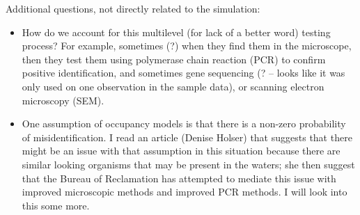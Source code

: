 \documentclass[12pt]{article}\usepackage[]{graphicx}\usepackage[]{color}
\begin{document}
Additional questions, not directly related to the simulation:
\begin{itemize}
	\item How do we account for this multilevel (for lack of a better word) testing process? For example, sometimes (?) when they find them in the microscope, then they test them using polymerase chain reaction (PCR) to confirm positive identification, and sometimes gene sequencing (? -- looks like it was only used on one observation in the sample data), or scanning electron microscopy (SEM).
	\item One assumption of occupancy models is that there is a non-zero probability of misidentification. I read an article (Denise Holser) that suggests that there might be an issue with that assumption in this situation because there are similar looking organisms that may be present in the waters; she then suggest that the Bureau of Reclamation has attempted to mediate this issue with improved microscopic methods and improved PCR methods. I will look into this some more.   
\end{itemize}

\singlespacing
\end{document}
